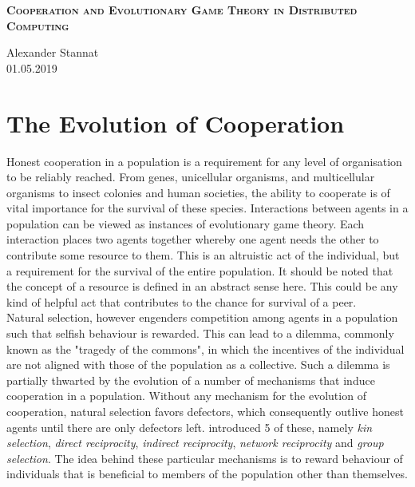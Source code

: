 \documentclass[11pt,a4paper]{article}
\theoremstyle{definition}
\theoremstyle{theorem}
\begin{document}
\bigskip\noindent
\begin{center}{\bf{\large \textsc{Cooperation and Evolutionary Game Theory in Distributed Computing}}}\end{center}\vspace{1em}
\begin{center}
{\Large Alexander Stannat} \vspace{3em}\\
01.05.2019
\end{center}


\section{The Evolution of Cooperation}
\label{sec:The Evolution of Cooperation}
Honest cooperation in a population is a requirement for any level of organisation to be reliably reached. From genes, unicellular organisms, and multicellular organisms to insect colonies and human societies, the ability to cooperate is of vital importance for the survival of these species. Interactions between agents in a population can be viewed as instances of evolutionary game theory. Each interaction places two agents together whereby one agent needs the other to contribute some resource to them. This is an altruistic act of the individual, but a requirement for the survival of the entire population. It should be noted that the concept of a resource is defined in an abstract sense here. This could be any kind of helpful act that contributes to the chance for survival of a peer.\vspace{1em}\\

\noindent{}Natural selection, however engenders competition among agents in a population such that selfish behaviour is rewarded. This can lead to a dilemma, commonly known as the "tragedy of the commons", in which the incentives of the individual are not aligned with those of the population as a collective. Such a dilemma is partially thwarted by the evolution of a number of mechanisms that induce cooperation in a population. Without any mechanism for the evolution of cooperation, natural selection favors defectors, which consequently outlive honest agents until there are only defectors left. \cite{5 Rules for the Evolution of Cooperation} introduced 5 of these, namely {\it kin selection}, {\it direct reciprocity}, {\it indirect reciprocity}, {\it network reciprocity} and {\it group selection}. The idea behind these particular mechanisms is to reward behaviour of individuals that is beneficial to members of the population other than themselves. \vspace{1em}\\
\end{document}

